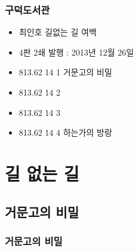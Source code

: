 \documentclass[12pt, a4paper, oneside]{book}
\let\stdsection\section
\renewcommand\section{\newpage\stdsection}
\begin{document}
%										
	\section{ 구덕도서관}




			\begin{itemize}[	topsep=0.0em,
							itemsep=0.0em,
							leftmargin=5em, 
							labelsep=1em ]
			\item					최인호 길없는 길 여백
			\item					4판 2쇄 발행 : 2013년 12월 26일 \\ 

			\item			813.62 14 1 거문고의 비밀
			\item			813.62 14 2 
			\item			813.62 14 3
			\item			813.62 14 4 하는가의 방랑

			\end{itemize}	






	\part{길 없는 길}
	\noptcrule
	\parttoc				



%										
	\chapter{ 거문고의 비밀}

%										
	\section{ 거문고의 비밀 }
\end{document}
